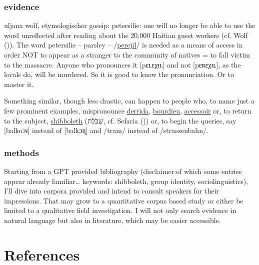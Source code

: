 \documentclass[
  letterpaper,
  DIV=11,
  numbers=noendperiod]{scrartcl}
\begin{document}
\subsubsection{evidence}\label{evidence}

uljana wolf, etymologischer gossip: petersilie: one will no longer be
able to use the word unreflected after reading about the 20,000 Haitian
guest workers (cf. Wolf
()). The word petersilie --
parsley -- /\hyperref[tofollow]{perejil}/ is needed as a means of access
in order NOT to appear as a stranger to the community of natives = to
fall victim to the massacre. Anyone who pronounces it
{[}p{\ipafont ɛʟɛ}χ{\ipafont ɪʟ}{]} and not
{[}p{\ipafont ɛʀɛ}χ{\ipafont ɪʟ}{]}, as the locals do, will be murdered.
So it is good to know the pronunciation. Or to master it.

Something similar, though less drastic, can happen to people who, to
name just a few prominent examples, mispronounce
\hyperref[tofollow]{derrida}, \hyperref[tofollow]{bourdieu},
\hyperref[tofollow]{accessoir} or, to return to the subject,
\hyperref[tofollow]{shibboleth} (שִׁבֹּלֶת, cf. Sefaria
()) or, to begin the queries,
say {[}balko{\ipafont ːɴ}{]} instead of {[}balk{\ipafont ɔɳ}{]} and
/tram/ instead of /straszenbahn/.

\subsubsection{methods}\label{methods}

Starting from a GPT provided bibliography (disclaimer:of which some
entries appear already familiar\ldots{} keywords: shibboleth, group
identity, sociolinguistics), I'll dive into corpora provided and intend
to consult speakers for their impressions. That may grow to a
quantitative corpus based study or either be limited to a qualitative
field investigation. I will not only search evidence in natural language
but also in literature, which may be easier accessible.

\section*{References}\label{references}
\end{document}
